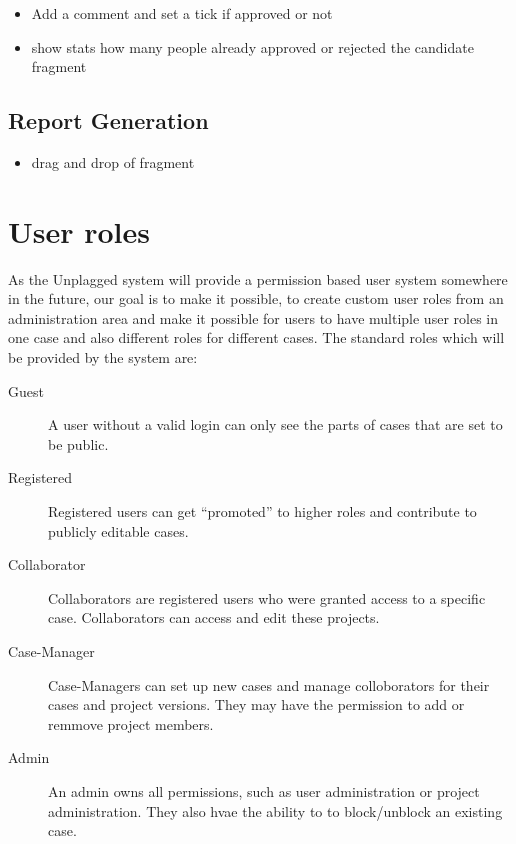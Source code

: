 \begin{itemize}
\item Add a comment and set a tick if approved or not
\item show stats how many people already approved or rejected the candidate fragment
\end{itemize}

\subsection{Report Generation}
\begin{itemize}
\item  drag and drop of fragment
\end{itemize}


\section{User roles}

As the Unplagged system will provide a permission based user system somewhere in the future, our goal is to make it 
possible, to create custom 
user roles from an administration area and make it possible for users to have multiple user roles in one case and also 
different roles for different cases.
The standard roles which will be provided by the system are:

\begin{description}
\item[Guest]
A user without a valid login can only see the parts of cases that are set to be public.
\item[Registered]
Registered users can get \enquote{promoted} to higher roles and contribute to publicly editable cases.
\item[Collaborator]
Collaborators are registered users who were granted access to a specific case. Collaborators can access and edit these projects.
\item[Case-Manager]
Case-Managers can set up new cases and manage colloborators for their cases and project versions. They may have the permission to add or remmove project members.
\item[Admin]
An admin owns all permissions, such as user administration or project administration. They also hvae the ability to to block/unblock an existing case.
\end{description}

